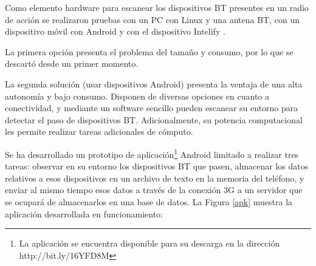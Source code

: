 \documentclass[twocolumn,twoside]{Jornadas}
\begin{document}
Como elemento hardware para escanear los dispositivos BT presentes en un radio de acción se realizaron pruebas con un PC con Linux y una antena BT, con un dispositivo móvil con Android y con el dispositivo Intelify \cite{intelify}.

La primera opción presenta el problema del tamaño y consumo, por lo que se descartó desde un primer momento.

La segunda solución (usar dispositivos Android) presenta la ventaja de una alta autonomía y bajo consumo. Disponen de diversas opciones en cuanto a conectividad, y mediante un software sencillo pueden escanear su entorno para detectar el paso de dispositivos BT. Adicionalmente, su potencia computacional les permite realizar tareas adicionales de cómputo.

Se ha desarrollado un prototipo de aplicación\footnote{La aplicación se encuentra disponible para su descarga en la dirección http://bit.ly/16YFD8M} 
Android limitado a realizar tres tareas: observar en su entorno los dispositivos BT que pasen, almacenar los datos relativos a esos dispositivos en un archivo de texto en la memoria del teléfono, y enviar al mismo tiempo esos datos a través de la conexión 3G a un servidor que se ocupará de almacenarlos en una base de datos. 
La Figura \ref{apk} muestra la aplicación desarrollada en funcionamiento:
\end{document}
